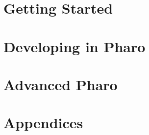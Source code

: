 \documentclass[a4paper,10pt,twoside]{book}
\begin{document}
\part{Getting Started}




\part{Developing in Pharo}








\part{Advanced Pharo}


\appendix
\part{Appendices}



{\small\raggedright\printindex}
\pagestyle{empty}
\cleardoublepage
~ %
\cleardoublepage
~ %
\cleardoublepage
\end{document}
